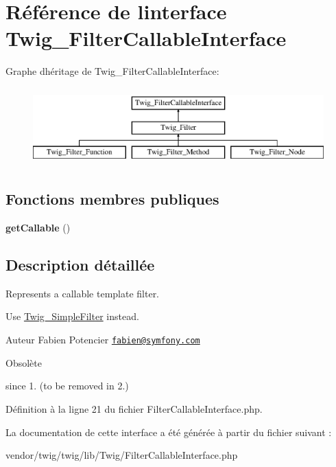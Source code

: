 \hypertarget{interface_twig___filter_callable_interface}{}\section{Référence de l\textquotesingle{}interface Twig\+\_\+\+Filter\+Callable\+Interface}
\label{interface_twig___filter_callable_interface}
Graphe d\textquotesingle{}héritage de Twig\+\_\+\+Filter\+Callable\+Interface\+:\begin{figure}[H]
\begin{center}
\leavevmode
\includegraphics[height=3.000000cm]{interface_twig___filter_callable_interface}
\end{center}
\end{figure}
\subsection*{Fonctions membres publiques}
\begin{DoxyCompactItemize}
\item 
{\bfseries get\+Callable} ()\hypertarget{interface_twig___filter_callable_interface_a0be839e0782a38a172c386bd963375c9}{}\label{interface_twig___filter_callable_interface_a0be839e0782a38a172c386bd963375c9}

\end{DoxyCompactItemize}


\subsection{Description détaillée}
Represents a callable template filter.

Use \hyperlink{class_twig___simple_filter}{Twig\+\_\+\+Simple\+Filter} instead.

\begin{DoxyAuthor}{Auteur}
Fabien Potencier \href{mailto:fabien@symfony.com}{\tt fabien@symfony.\+com}
\end{DoxyAuthor}
\begin{DoxyRefDesc}{Obsolète}
\item[\hyperlink{deprecated__deprecated000021}{Obsolète}]since 1. (to be removed in 2.) \end{DoxyRefDesc}


Définition à la ligne 21 du fichier Filter\+Callable\+Interface.\+php.



La documentation de cette interface a été générée à partir du fichier suivant \+:\begin{DoxyCompactItemize}
\item 
vendor/twig/twig/lib/\+Twig/Filter\+Callable\+Interface.\+php\end{DoxyCompactItemize}
